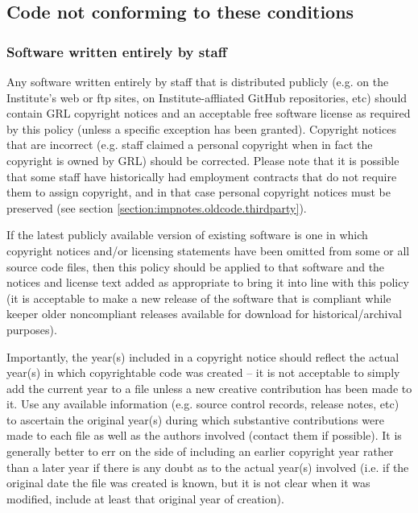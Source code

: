 \documentclass[10pt,a4paper]{article}
\begin{document}
\subsection{Code not conforming to these conditions}
\label{section:impnotes.oldcode}

\subsubsection{Software written entirely by staff}
\label{section:impnotes.oldcode.grlcopyright}
\par Any software written entirely by staff that is distributed publicly (e.g. on the 
Institute's web or ftp sites, on Institute-affliated GitHub repositories, etc) 
should contain GRL copyright notices and an acceptable free software license 
as required by this policy (unless a specific exception has been granted). 
Copyright notices that are incorrect (e.g. staff claimed a personal copyright 
when in fact the copyright is owned by GRL) should be corrected. Please 
note that it is possible that some staff have historically had employment 
contracts that do not require them to assign copyright, and in that case 
personal copyright notices must be preserved (see section 
\ref{section:impnotes.oldcode.thirdparty}).

\par If the latest publicly available version of existing software is one in which  
copyright notices and/or licensing statements have been omitted from some or 
all source code files, then this policy should be applied to that software and 
the notices and license text added as appropriate to bring it into line with this 
policy (it is acceptable to make a new release of the software that is compliant 
while keeper older noncompliant releases available for download for 
historical/archival purposes). 

\par Importantly, the year(s) included in a copyright notice should reflect the 
actual year(s) in which copyrightable code was created -- it is not acceptable 
to simply add the current year to a file unless a new creative contribution has 
been made to it. Use any available information (e.g. source control records, 
release notes, etc) to ascertain the original year(s) during which substantive 
contributions were made to each file as well as the authors involved (contact 
them if possible). It is generally better to err on the side of including an earlier 
copyright year rather than a later year if there is any doubt as to the actual year(s) 
involved (i.e. if the original date the file was created is known, but it is not clear 
when it was modified, include at least that original year of creation). 
\end{document}
